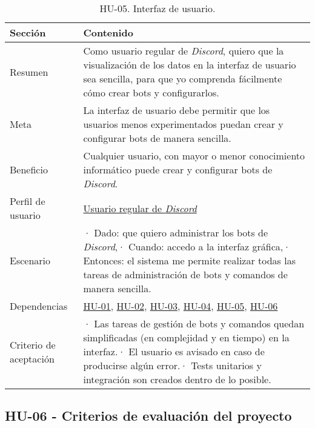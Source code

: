 \begin{table}[H]
    \centering
    \def\arraystretch{1.25}
    \begin{adjustbox}{max width=\textwidth}
    \begin{tabularx}{\textwidth}{|l|L|}
    \hline
        \textbf{Sección} & \textbf{Contenido} \\ \hline
    \hline
        Resumen & Como usuario regular de \textit{Discord}, quiero que la visualización de los datos en la interfaz de usuario sea sencilla, para que yo comprenda fácilmente cómo crear bots y configurarlos. \\ \hline
        Meta & La interfaz de usuario debe permitir que los usuarios menos experimentados puedan crear y configurar bots de manera sencilla. \\ \hline
        Beneficio & Cualquier usuario, con mayor o menor conocimiento informático puede crear y configurar bots de \textit{Discord}. \\ \hline
        Perfil de usuario & \hyperref[sec:personaUsuarioDiscord]{Usuario regular de \textit{Discord}} \\ \hline
        Escenario & · Dado: que quiero administrar los bots de \textit{Discord},\linebreak · Cuando: accedo a la interfaz gráfica,\linebreak · Entonces: el sistema me permite realizar todas las tareas de administración de bots y comandos de manera sencilla. \\ \hline
        Dependencias & \hyperref[sec:hu01]{HU-01}, \hyperref[sec:hu02]{HU-02}, \hyperref[sec:hu03]{HU-03}, \hyperref[sec:hu04]{HU-04}, \hyperref[sec:hu05]{HU-05}, \hyperref[sec:hu06]{HU-06} \\ \hline
        Criterio de aceptación & · Las tareas de gestión de bots y comandos quedan simplificadas (en complejidad y en tiempo) en la interfaz.\linebreak · El usuario es avisado en caso de producirse algún error.\linebreak · Tests unitarios y integración son creados dentro de lo posible. \\ \hline
    \end{tabularx}
    \end{adjustbox}
    \caption{HU-05. Interfaz de usuario.}
\end{table}
\bigskip
\bigskip
\bigskip
\bigskip
\bigskip
\bigskip
\pagebreak

\subsection{HU-06 - Criterios de evaluación del proyecto}
\label{sec:hu06}

